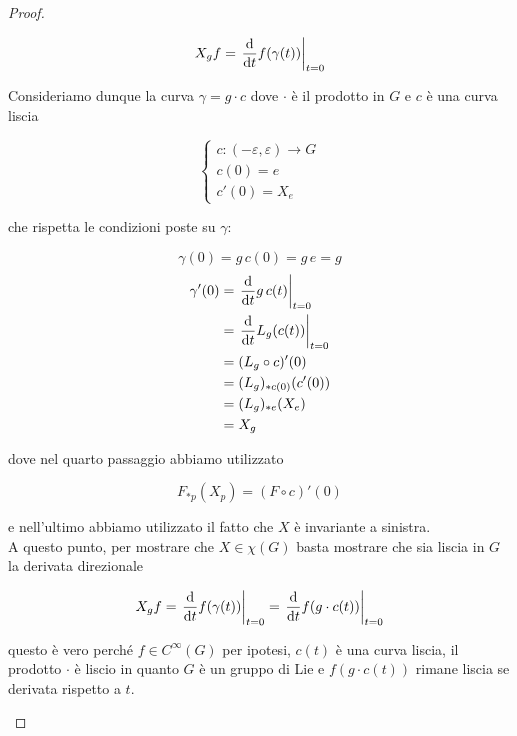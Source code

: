 \begin{proof}
\begin{enumerate}
		\begin{equation}
			X_{g} f = \eval{ \dv{t} f(\gamma(t)) }_{t=0}
		\end{equation}
	
		Consideriamo dunque la curva $ \gamma = g \cdot c $ dove $ \cdot $ è il prodotto in $ G $ e $ c $ è una curva liscia
		
		\begin{equation}
			\begin{cases}
				c : (-\varepsilon,\varepsilon) \to G \\
				c(0) = e \\
				c'(0) = X_{e}
			\end{cases}
		\end{equation}
	
		che rispetta le condizioni poste su $ \gamma $:
		
		\begin{equation}
			\gamma(0) = g \, c(0)= g \, e = g
		\end{equation}
		\begin{align}
			\begin{split}
				\gamma'(0) &= \eval{ \dv{t} g \, c(t) }_{t=0} \\
				&= \eval{ \dv{t} L_{g}(c(t)) }_{t=0} \\
				&= (L_{g} \circ c)'(0) \\
				&= (L_{g})_{*c(0)} (c'(0)) \\
				&= (L_{g})_{*e} (X_{e}) \\
				&= X_{g}
			\end{split}
		\end{align}
	
		dove nel quarto passaggio abbiamo utilizzato
		
		\begin{equation}
			F_{*p}(X_{p}) = (F \circ c)'(0)
		\end{equation}
		
		e nell'ultimo abbiamo utilizzato il fatto che $ X $ è invariante a sinistra.\\
		A questo punto, per mostrare che $ X \in \chi(G) $ basta mostrare che sia liscia in $ G $ la derivata direzionale
		
		\begin{equation}
			X_{g} f = \eval{ \dv{t} f(\gamma(t)) }_{t=0} %
			= \eval{ \dv{t} f(g \cdot c(t)) }_{t=0}
		\end{equation}
	
		questo è vero perché $ f \in C^{\infty}(G) $ per ipotesi, $ c(t) $ è una curva liscia, il prodotto $ \cdot $ è liscio in quanto $ G $ è un gruppo di Lie e $ f(g \cdot c(t)) $ rimane liscia se derivata rispetto a $ t $.
		

\end{enumerate}
\end{proof}
